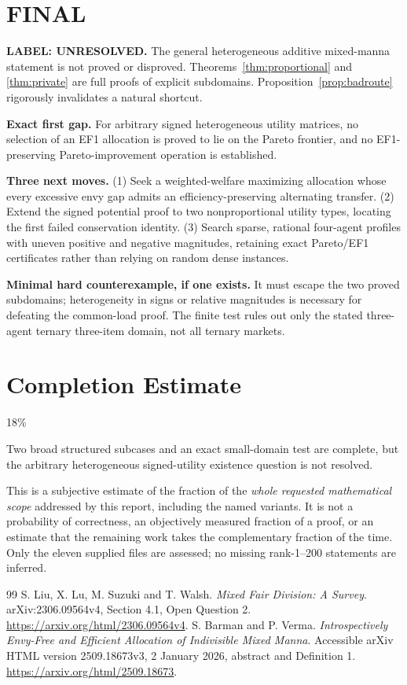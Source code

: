 \documentclass[11pt,a4paper]{article}
\theoremstyle{remark}\newtheorem{remark}[theorem]{Remark}
\begin{document}
\section{FINAL}
\textbf{LABEL: UNRESOLVED.}
The general heterogeneous additive mixed-manna statement is not proved or disproved. Theorems~\ref{thm:proportional} and \ref{thm:private} are full proofs of explicit subdomains. Proposition~\ref{prop:badroute} rigorously invalidates a natural shortcut.

\textbf{Exact first gap.} For arbitrary signed heterogeneous utility matrices, no selection of an EF1 allocation is proved to lie on the Pareto frontier, and no EF1-preserving Pareto-improvement operation is established.

\textbf{Three next moves.} (1) Seek a weighted-welfare maximizing allocation whose every excessive envy gap admits an efficiency-preserving alternating transfer. (2) Extend the signed potential proof to two nonproportional utility types, locating the first failed conservation identity. (3) Search sparse, rational four-agent profiles with uneven positive and negative magnitudes, retaining exact Pareto/EF1 certificates rather than relying on random dense instances.

\textbf{Minimal hard counterexample, if one exists.} It must escape the two proved subdomains; heterogeneity in signs or relative magnitudes is necessary for defeating the common-load proof. The finite test rules out only the stated three-agent ternary three-item domain, not all ternary markets.

\section{Completion Estimate}
18\%

Two broad structured subcases and an exact small-domain test are complete, but the arbitrary heterogeneous signed-utility existence question is not resolved.

This is a subjective estimate of the fraction of the \emph{whole requested mathematical scope} addressed by this report, including the named variants. It is not a probability of correctness, an objectively measured fraction of a proof, or an estimate that the remaining work takes the complementary fraction of the time. Only the eleven supplied files are assessed; no missing rank-1--200 statements are inferred.

\begin{thebibliography}{99}
 S. Liu, X. Lu, M. Suzuki and T. Walsh. \emph{Mixed Fair Division: A Survey}. arXiv:2306.09564v4, Section 4.1, Open Question 2. \url{https://arxiv.org/html/2306.09564v4}.
 S. Barman and P. Verma. \emph{Introspectively Envy-Free and Efficient Allocation of Indivisible Mixed Manna}. Accessible arXiv HTML version 2509.18673v3, 2 January 2026, abstract and Definition 1. \url{https://arxiv.org/html/2509.18673}.
\end{thebibliography}
\end{document}
